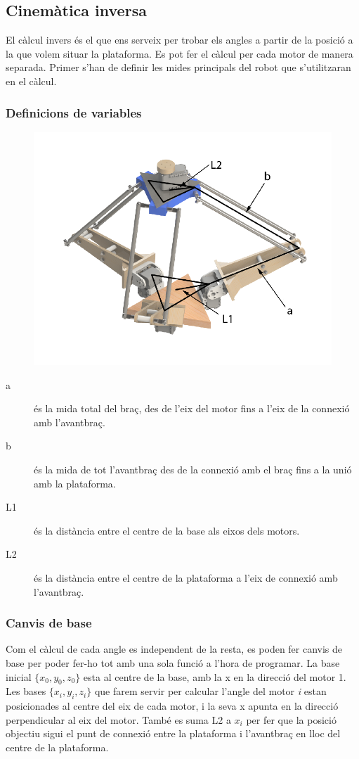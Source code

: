 \subsection{Cinemàtica inversa}

El càlcul invers és el que ens serveix per trobar els angles a partir de la posició a la que volem situar la plataforma. Es pot fer el càlcul per cada motor de manera separada. Primer s'han de definir les mides principals del robot que s'utilitzaran en el càlcul.

\subsubsection{Definicions de variables}
\begin{figure}[h!]
\centering
\includegraphics[width=12cm]{./imgComp/esquema_general}
\end{figure}

\begin{description}
\item[a] és la mida total del braç, des de l'eix del motor fins a l'eix de la connexió amb l'avantbraç.
\item[b] és la mida de tot l'avantbraç des de la connexió amb el braç fins a la unió amb la plataforma.
\item[L1] és la distància entre el centre de la base als eixos dels motors.
\item[L2] és la distància entre el centre de la plataforma a l'eix de connexió amb l'avantbraç.
\end{description}

\subsubsection{Canvis de base}
Com el càlcul de cada angle es independent de la resta, es poden fer canvis de base per poder fer-ho tot amb una sola funció a l'hora de programar. La base inicial \(\{x_0,y_0,z_0\}\) esta al centre de la base, amb la x en la direcció del motor 1. Les bases \(\{x_i,y_i,z_i\}\) que farem servir per calcular l'angle del motor \emph{i} estan posicionades al centre del eix de cada motor, i la seva x apunta en la direcció perpendicular al eix del motor. També es suma L2 a \(x_i\) per fer que la posició objectiu sigui el punt de connexió entre la plataforma i l'avantbraç en lloc del centre de la plataforma.

